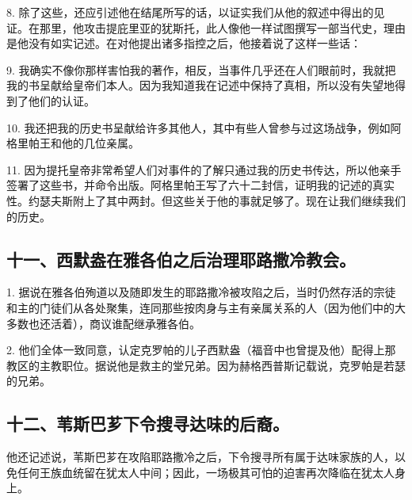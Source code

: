 8. 除了这些，还应引述他在结尾所写的话，以证实我们从他的叙述中得出的见证。在那里，他攻击提庇里亚的犹斯托，此人像他一样试图撰写一部当代史，理由是他没有如实记述。在对他提出诸多指控之后，他接着说了这样一些话：\par

9. 我确实不像你那样害怕我的著作，相反，当事件几乎还在人们眼前时，我就把我的书呈献给皇帝们本人。因为我知道我在记述中保持了真相，所以没有失望地得到了他们的认证。\par

10. 我还把我的历史书呈献给许多其他人，其中有些人曾参与过这场战争，例如阿格里帕王和他的几位亲属。\par

11. 因为提托皇帝非常希望人们对事件的了解只通过我的历史书传达，所以他亲手签署了这些书，并命令出版。阿格里帕王写了六十二封信，证明我的记述的真实性。约瑟夫斯附上了其中两封。但这些关于他的事就足够了。现在让我们继续我们的历史。\par


\subsection{十一、西默盎在雅各伯之后治理耶路撒冷教会。}

1. 据说在雅各伯殉道以及随即发生的耶路撒冷被攻陷之后，当时仍然存活的宗徒和主的门徒们从各处聚集，连同那些按肉身与主有亲属关系的人（因为他们中的大多数也还活着），商议谁配继承雅各伯。\par

2. 他们全体一致同意，认定克罗帕的儿子西默盎（福音中也曾提及他）配得上那教区的主教职位。据说他是救主的堂兄弟。因为赫格西普斯记载说，克罗帕是若瑟的兄弟。\par


\subsection{十二、苇斯巴芗下令搜寻达味的后裔。}

他还记述说，苇斯巴芗在攻陷耶路撒冷之后，下令搜寻所有属于达味家族的人，以免任何王族血统留在犹太人中间；因此，一场极其可怕的迫害再次降临在犹太人身上。\par


